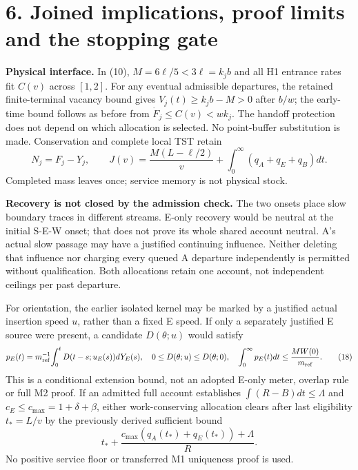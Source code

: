 \documentclass[11pt,a4paper]{article}
\begin{document}
\newpage
\section*{6. Joined implications, proof limits and the stopping gate}

\textbf{Physical interface.} In (10), $M=6\ell/5<3\ell=k_jb$ and
all H1 entrance rates fit $C(v)$ across $[1,2]$. For any eventual admissible
departures, the retained finite-terminal vacancy bound gives
$V_j(t)\geq k_jb-M>0$ after $b/w$; the early-time bound follows as before
from $\dot F_j\leq C(v)<wk_j$. The handoff protection does not depend
on which allocation is selected. No point-buffer substitution is made.
Conservation and complete local TST retain
\begin{equation}
 N_j=F_j-Y_j,\qquad
 J(v)=\frac{M(L-\ell/2)}v+\int_0^\infty(q_A+q_E+q_B)dt. \tag{17}
\end{equation}
Completed mass leaves once; service memory is not physical stock.

\textbf{Recovery is not closed by the admission check.} The two onsets
place slow boundary traces in different streams. E-only recovery would
be neutral at the initial S-E-W onset; that does not prove its whole shared
account neutral. A's actual slow passage may have a justified continuing
influence. Neither deleting that influence nor charging every queued A
departure independently is permitted without qualification. Both allocations
retain one account, not independent ceilings per past departure.

For orientation, the earlier isolated kernel may be marked by a justified
actual insertion speed $u$, rather than a fixed E speed. If only a separately
justified E source were present, a candidate $D(\theta;u)$ would satisfy
\begin{equation}
 p_E(t)=m_{\rm ref}^{-1}\!\int_0^tD(t-s;u_E(s))dY_E(s),\quad
 0\leq D(\theta;u)\leq D(\theta;0),\quad
 \int_0^\infty p_E(t)dt\leq\frac{MW(0)}{m_{\rm ref}}. \tag{18}
\end{equation}
This is a conditional extension bound, not an adopted E-only meter,
overlap rule or full M2 proof. If an admitted full account establishes
$\int(R-B)dt\leq\Lambda$ and $c_E\leq c_{\max}=1+\delta+\beta$,
either work-conserving allocation clears after last eligibility $t_*=L/v$
by the previously derived sufficient bound
\begin{equation}
 t_*+\frac{c_{\max}(q_A(t_*)+q_E(t_*))+\Lambda}{R}. \tag{19}
\end{equation}
No positive service floor or transferred M1 uniqueness proof is used.
\end{document}
